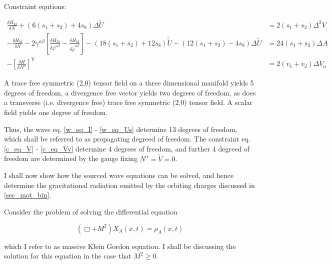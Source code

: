 \documentclass[11pt]{article}
\begin{document}
\begin{landscape}
Constraint equtions:

\begin{align}
	\frac{\delta H_{\text{M}}}{\delta N}
	+
	\left( 
		6 \left( s_1 + s_2 \right) + 4 s_8
	\right)
	\Delta \tilde{U}
	&=
	2 \left( s_1 + s_2 \right) \Delta^2 V
	\label{c_eq_V}
	\\
	- \frac{\delta H_{\text{M}}}{\delta N}
	- 2 \gamma^{\alpha \beta}
	\left[ 
		\frac{
			\delta H_{\text{M}}
		}{
			\delta \bar{\varphi}^{\alpha \beta}
		}
		-
		\frac{
			\delta H_{\text{M}}
		}{
			\delta \bar{\bar{\varphi}}^{\alpha \beta}
		}
	\right]
	-
	\left(
	18 \left( s_1  + s_2 \right) +  12 s_8
	\right) \ddot{\tilde{U}}
	-
	\left(
	12 \left( s_1  + s_2 \right) - 4 s_8 
	\right)
	\Delta \tilde{U}
	&=
	24 \left( s_1 + s_2 \right) \Delta A
	\label{c_eq_A}
	\\
	-
	\left[
	\frac{\delta H}{\delta N^\alpha}
	\right]^{\text{V}}
	&=
	2 \left( v_1 + v_2 \right) \Delta \dot{V}_\alpha
	\label{c_eq_Vv}
\end{align}
	
\end{landscape}

A trace free symmetric (2,0) tensor field on a three dimensional manifold yields 5 degrees of freedom, a divergence free vector yields two degrees of freedom, as does a transverse (i.e. divergence free) trace free symmetric (2,0) tensor field. A scalar field yields one degree of freedom.

Thus, the wave eq. \ref{w_eq_I} - \ref{w_eq_Us} determine 13 degrees of freedom, which shall be referred to as propagating degreed of freedom. The constraint eq. \ref{c_eq_V} - \ref{c_eq_Vv} determine 4 degrees of freedom, and further 4 degreed of freedom are determined by the gauge fixing $N^\alpha = \tilde{V} = 0$. 

I shall now show how the sourced wave equations can be solved, and hence determine the gravitational radiation emitted by the orbiting charges discussed in \ref{sec_mot_bin}.

Consider the problem of solving the differential equation

\begin{equation} \label{massive_kg}
	\left( \Box + M^2 \right) X_A \left(x, t \right) 
	=
	\rho_A \left(x, t \right)  
\end{equation}

which I refer to as massive Klein Gordon equation. I shall be discussing the solution for this equation in the case that $M^2 \ge 0$.
\end{document}
